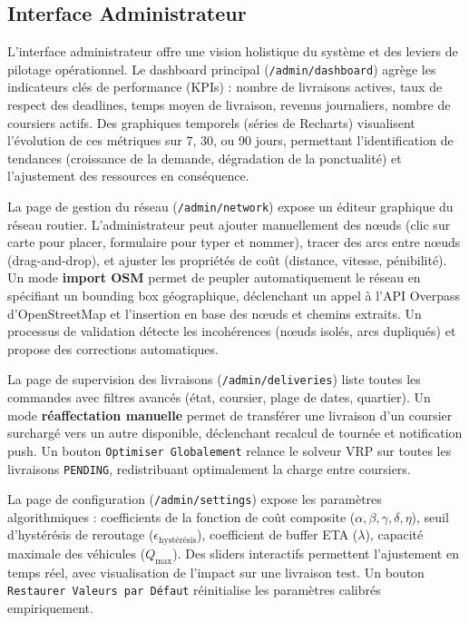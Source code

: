 \subsection{Interface Administrateur}

L'interface administrateur offre une vision holistique du système et des leviers de pilotage opérationnel. Le dashboard principal (\texttt{/admin/dashboard}) agrège les indicateurs clés de performance (KPIs) : nombre de livraisons actives, taux de respect des deadlines, temps moyen de livraison, revenus journaliers, nombre de coursiers actifs. Des graphiques temporels (séries de Recharts) visualisent l'évolution de ces métriques sur 7, 30, ou 90 jours, permettant l'identification de tendances (croissance de la demande, dégradation de la ponctualité) et l'ajustement des ressources en conséquence.

La page de gestion du réseau (\texttt{/admin/network}) expose un éditeur graphique du réseau routier. L'administrateur peut ajouter manuellement des nœuds (clic sur carte pour placer, formulaire pour typer et nommer), tracer des arcs entre nœuds (drag-and-drop), et ajuster les propriétés de coût (distance, vitesse, pénibilité). Un mode \textbf{import OSM} permet de peupler automatiquement le réseau en spécifiant un bounding box géographique, déclenchant un appel à l'API Overpass d'OpenStreetMap et l'insertion en base des nœuds et chemins extraits. Un processus de validation détecte les incohérences (nœuds isolés, arcs dupliqués) et propose des corrections automatiques.

La page de supervision des livraisons (\texttt{/admin/deliveries}) liste toutes les commandes avec filtres avancés (état, coursier, plage de dates, quartier). Un mode \textbf{réaffectation manuelle} permet de transférer une livraison d'un coursier surchargé vers un autre disponible, déclenchant recalcul de tournée et notification push. Un bouton \texttt{Optimiser Globalement} relance le solveur VRP sur toutes les livraisons \texttt{PENDING}, redistribuant optimalement la charge entre coursiers.

La page de configuration (\texttt{/admin/settings}) expose les paramètres algorithmiques : coefficients de la fonction de coût composite ($\alpha, \beta, \gamma, \delta, \eta$), seuil d'hystérésis de reroutage ($\epsilon_{\text{hystérésis}}$), coefficient de buffer ETA ($\lambda$), capacité maximale des véhicules ($Q_{\max}$). Des sliders interactifs permettent l'ajustement en temps réel, avec visualisation de l'impact sur une livraison test. Un bouton \texttt{Restaurer Valeurs par Défaut} réinitialise les paramètres calibrés empiriquement.

